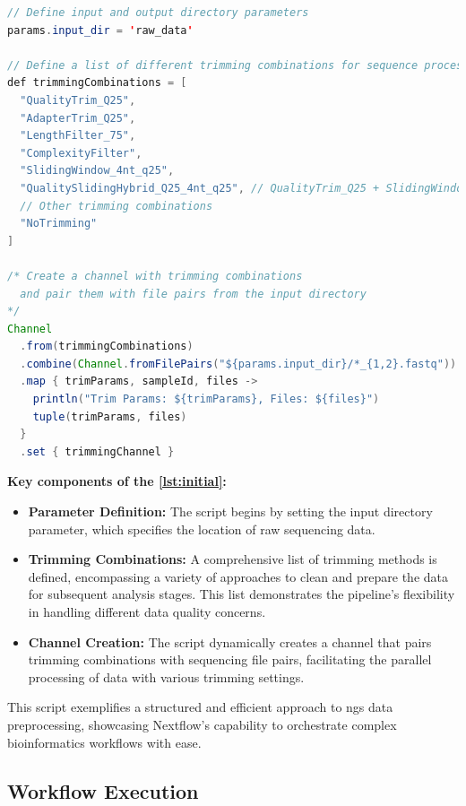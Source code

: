 \begin{lstlisting}[language=Java, label={lst:initial}, caption={Initial Setup and Trimming Strategy Definition in Nextflow}]
// Define input and output directory parameters
params.input_dir = 'raw_data'

// Define a list of different trimming combinations for sequence processing
def trimmingCombinations = [
  "QualityTrim_Q25",
  "AdapterTrim_Q25",
  "LengthFilter_75",
  "ComplexityFilter",
  "SlidingWindow_4nt_q25",
  "QualitySlidingHybrid_Q25_4nt_q25", // QualityTrim_Q25 + SlidingWindow_4nt_q25
  // Other trimming combinations
  "NoTrimming"
]

/* Create a channel with trimming combinations 
  and pair them with file pairs from the input directory
*/
Channel
  .from(trimmingCombinations)
  .combine(Channel.fromFilePairs("${params.input_dir}/*_{1,2}.fastq"))
  .map { trimParams, sampleId, files -> 
    println("Trim Params: ${trimParams}, Files: ${files}") 
    tuple(trimParams, files) 
  }
  .set { trimmingChannel }

\end{lstlisting}

\textbf{Key components of the \autoref{lst:initial}:}

\begin{itemize}
    \item \textbf{Parameter Definition:} The script begins by setting the input directory parameter, which specifies the location of raw \gls{sequencing} data.
    \item \textbf{Trimming Combinations:} A comprehensive list of \gls{trimming} methods is defined, encompassing a variety of approaches to clean and prepare the data for subsequent analysis stages. This list demonstrates the pipeline's flexibility in handling different data quality concerns.
    \item \textbf{Channel Creation:} The script dynamically creates a channel that pairs \gls{trimming} combinations with \gls{sequencing} file pairs, facilitating the parallel processing of data with various \gls{trimming} settings.
\end{itemize}

This script exemplifies a structured and efficient approach to \gls{ngs} data preprocessing, showcasing Nextflow's capability to orchestrate complex bioinformatics workflows with ease.


\subsection{Workflow Execution}


